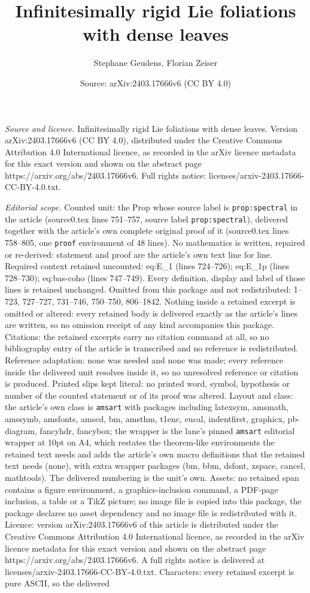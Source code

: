 \documentclass[10pt,a4paper]{amsart}
\title[Infinitesimally rigid Lie foliations with dense leaves]{Infinitesimally rigid Lie foliations with dense leaves}
\author{Stephane Geudens, Florian Zeiser}
\date{Source: arXiv:2403.17666v6 (CC BY 4.0)}
\begin{document}
\maketitle

\noindent\emph{Source and licence.} Infinitesimally rigid Lie foliations with dense leaves. Version arXiv:2403.17666v6 (CC BY 4.0), distributed under the Creative Commons Attribution 4.0 International licence, as recorded in the arXiv licence metadata for this exact version and shown on the abstract page https://arxiv.org/abs/2403.17666v6. Full rights notice: licenses/arxiv-2403.17666-CC-BY-4.0.txt.\par\smallskip

\noindent\textit{Editorial scope.} Counted unit: the Prop whose source label is \texttt{prop:spectral} in the article (source0.tex lines 751--757, source label \texttt{prop:spectral}), delivered together with the article's own complete original proof of it (source0.tex lines 758--805, one \texttt{proof} environment of 48 lines). No mathematics is written, repaired or re-derived: statement and proof are the article's own text line for line. Required context retained uncounted: eq:E\_1 (lines 724--726); eq:E\_1p (lines 728--730); eq:bas-coho (lines 747--749). Every definition, display and label of those lines is retained unchanged. Omitted from this package and not redistributed: 1--723, 727--727, 731--746, 750--750, 806--1842. Nothing inside a retained excerpt is omitted or altered: every retained body is delivered exactly as the article's lines are written, so no omission receipt of any kind accompanies this package. Citations: the retained excerpts carry no citation command at all, so no bibliography entry of the article is transcribed and no reference is redistributed. Reference adaptation: none was needed and none was made; every reference inside the delivered unit resolves inside it, so no unresolved reference or citation is produced. Printed slips kept literal: no printed word, symbol, hypothesis or number of the counted statement or of its proof was altered. Layout and class: the article's own class is \texttt{amsart} with packages including latexsym, amsmath, amssymb, amsfonts, amscd, bm, amsthm, t1enc, eucal, indentfirst, graphicx, pb-diagram, fancyhdr, fancybox; the wrapper is the lane's pinned \texttt{amsart} editorial wrapper at 10pt on A4, which restates the theorem-like environments the retained text needs and adds the article's own macro definitions that the retained text needs (none), with extra wrapper packages (bm, bbm, dsfont, xspace, cancel, mathtools). The delivered numbering is the unit's own. Assets: no retained span contains a figure environment, a graphics-inclusion command, a PDF-page inclusion, a table or a TikZ picture; no image file is copied into this package, the package declares no asset dependency and no image file is redistributed with it. Licence: version arXiv:2403.17666v6 of this article is distributed under the Creative Commons Attribution 4.0 International licence, as recorded in the arXiv licence metadata for this exact version and shown on the abstract page https://arxiv.org/abs/2403.17666v6. A full rights notice is delivered at licenses/arxiv-2403.17666-CC-BY-4.0.txt. Characters: every retained excerpt is pure ASCII, so the delivered 
\end{document}
